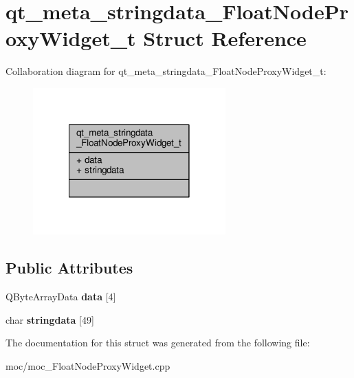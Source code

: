 \hypertarget{structqt__meta__stringdata___float_node_proxy_widget__t}{\section{qt\-\_\-meta\-\_\-stringdata\-\_\-\-Float\-Node\-Proxy\-Widget\-\_\-t Struct Reference}
\label{structqt__meta__stringdata___float_node_proxy_widget__t}
}


Collaboration diagram for qt\-\_\-meta\-\_\-stringdata\-\_\-\-Float\-Node\-Proxy\-Widget\-\_\-t\-:
\nopagebreak
\begin{figure}[H]
\begin{center}
\leavevmode
\includegraphics[width=210pt]{structqt__meta__stringdata___float_node_proxy_widget__t__coll__graph}
\end{center}
\end{figure}
\subsection*{Public Attributes}
\begin{DoxyCompactItemize}
\item 
\hypertarget{structqt__meta__stringdata___float_node_proxy_widget__t_acc75e53923766c1f119522dbf3b371e5}{Q\-Byte\-Array\-Data {\bfseries data} \mbox{[}4\mbox{]}}\label{structqt__meta__stringdata___float_node_proxy_widget__t_acc75e53923766c1f119522dbf3b371e5}

\item 
\hypertarget{structqt__meta__stringdata___float_node_proxy_widget__t_abaa09cb10941fc86f1b661b0aca5dc7f}{char {\bfseries stringdata} \mbox{[}49\mbox{]}}\label{structqt__meta__stringdata___float_node_proxy_widget__t_abaa09cb10941fc86f1b661b0aca5dc7f}

\end{DoxyCompactItemize}


The documentation for this struct was generated from the following file\-:\begin{DoxyCompactItemize}
\item 
moc/moc\-\_\-\-Float\-Node\-Proxy\-Widget.\-cpp\end{DoxyCompactItemize}
